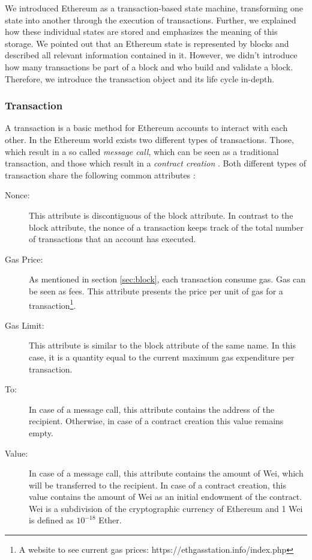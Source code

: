 We introduced Ethereum as a transaction-based state machine, transforming 
one state into another through the execution of transactions. Further, we explained 
how these individual states are stored and emphasizes the meaning of this storage. 
We pointed out that an Ethereum state is represented by blocks and described 
all relevant information contained in it.
However, we didn't introduce how many transactions be part 
of a block and who build and validate a block. Therefore, 
we introduce the transaction object and its life cycle in-depth.


\subsubsection{Transaction}
\label{sec:transaction}
A transaction is a basic method for Ethereum accounts to interact with each other. 
In the Ethereum world exists two different types of transactions. 
Those, which result in a so called \textit{message call}, which can be seen as a 
traditional transaction, and those which result in a \textit{contract creation} . 
Both different types of transaction share the following common attributes :

\begin{description}
	\item[Nonce: ] This attribute is discontiguous of the block attribute. In contrast to the block attribute, the nonce of a transaction keeps track of the total number of transactions that an account has executed. 
	\item[Gas Price: ] As mentioned in section \ref{sec:block}, each transaction consume gas. Gas can be seen as fees. This attribute presents the price per unit of gas for a transaction\footnote{A website to see current gas prices: https://ethgasstation.info/index.php}. 
	\item[Gas Limit: ] This attribute is similar to the block attribute of the same name. In this case, it is a quantity equal to the current maximum gas expenditure per transaction.  
	\item[To: ] In case of a message call, this attribute contains the address of the recipient. Otherwise, in case of a contract creation this value remains empty. 
	\item[Value: ] In case of a message call, this attribute contains the amount of Wei, which will be transferred to the recipient. 
	In case of a contract creation, this value contains the amount of Wei as an initial endowment of the contract. 
	Wei is a subdivision of the cryptographic currency of Ethereum and 1 Wei is defined as $10^{-18}$ Ether.
\end{description}

